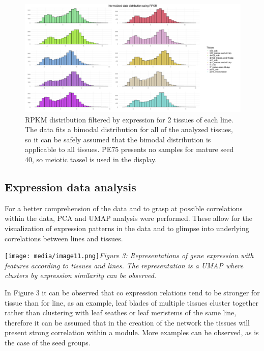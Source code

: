 \documentclass[
]{article}
\begin{document}
\begin{figure}[H]
	\centering
	\includegraphics[width=1\linewidth]{figures/normRPKM_distPlot.png}
	\caption[RPKM distribution]{\small RPKM distribution filtered by expression for 2 tissues of each line. The data fits a bimodal distribution for all of the analyzed tissues, so it can be safely assumed that the bimodal distribution is applicable to all tissues. PE75 presents no samples for mature seed 40, so meiotic tassel is used in the display.}
	\label{fig:}
\end{figure}

\hypertarget{expression-data-analysis}{%
\subsection{Expression data analysis}\label{expression-data-analysis}}

For a better comprehension of the data and to grasp at possible
correlations within the data, PCA and UMAP analysis were performed.
These allow for the visualization of expression patterns in the data and
to glimpse into underlying correlations between lines and tissues.

\texttt{[image: media/image11.png]}\emph{Figure
3: Representations of gene expression with features according to tissues
and lines. The representation is a UMAP where clusters by expression
similarity can be observed.}

In Figure 3 it can be observed that co expression relations tend to be
stronger for tissue than for line, as an example, leaf blades of
multiple tissues cluster together rather than clustering with leaf
seathes or leaf meristems of the same line, therefore it can be assumed
that in the creation of the network the tissues will present strong
correlation within a module. More examples can be observed, as is the
case of the seed groups.
\end{document}
